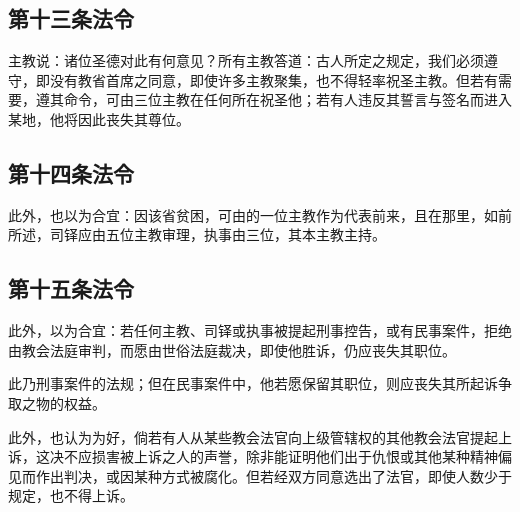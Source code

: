 
\subsection{第十三条法令}

\par

主教说：诸位圣德对此有何意见？所有主教答道：古人所定之规定，我们必须遵守，即没有教省首席之同意，即使许多主教聚集，也不得轻率祝圣主教。但若有需要，遵其命令，可由三位主教在任何所在祝圣他；若有人违反其誓言与签名而进入某地，他将因此丧失其尊位。\par


\subsection{第十四条法令}

\par

此外，也以为合宜：因该省贫困，可由的一位主教作为代表前来，且在那里，如前所述，司铎应由五位主教审理，执事由三位，其本主教主持。\par


\subsection{第十五条法令}

\par

此外，以为合宜：若任何主教、司铎或执事被提起刑事控告，或有民事案件，拒绝由教会法庭审判，而愿由世俗法庭裁决，即使他胜诉，仍应丧失其职位。\par

此乃刑事案件的法规；但在民事案件中，他若愿保留其职位，则应丧失其所起诉争取之物的权益。\par

此外，也认为为好，倘若有人从某些教会法官向上级管辖权的其他教会法官提起上诉，这决不应损害被上诉之人的声誉，除非能证明他们出于仇恨或其他某种精神偏见而作出判决，或因某种方式被腐化。但若经双方同意选出了法官，即使人数少于规定，也不得上诉。\par

